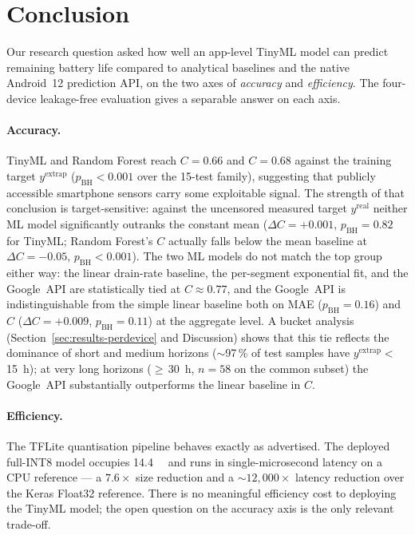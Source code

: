 \documentclass[conference]{IEEEtran}
\begin{document}
\section{Conclusion}
Our research question asked how well an app-level TinyML model can
predict remaining battery life compared to analytical baselines and
the native Android~12 prediction API, on the two axes of
\emph{accuracy} and \emph{efficiency}. The four-device leakage-free
evaluation gives a separable answer on each axis.

\paragraph{Accuracy.}
TinyML and Random Forest reach $C{=}0.66$ and $C{=}0.68$ against the
training target $y^{\text{extrap}}$ ($p_{\text{BH}} < 0.001$ over the
15-test family), suggesting that publicly accessible smartphone sensors
carry some exploitable signal. The strength of that conclusion is
target-sensitive: against the uncensored measured target
$y^{\text{real}}$ neither ML model significantly outranks the constant
mean ($\Delta C{=}{+}0.001$, $p_{\text{BH}}{=}0.82$ for TinyML;
Random Forest's $C$ actually falls below the mean baseline at
$\Delta C{=}{-}0.05$, $p_{\text{BH}}{<}0.001$). The two ML models do
not match the top group either way: the linear drain-rate baseline,
the per-segment exponential fit, and the Google~API are statistically
tied at $C \approx 0.77$, and the Google~API is indistinguishable
from the simple linear baseline both on MAE ($p_{\text{BH}}{=}0.16$)
and $C$ ($\Delta C{=}{+}0.009$, $p_{\text{BH}}{=}0.11$) at the
aggregate level. A bucket analysis
(Section~\ref{sec:results-perdevice} and Discussion) shows that this
tie reflects the dominance of short and medium horizons
($\sim$97\,\% of test samples have $y^{\text{extrap}} <$\,\SI{15}{\hour});
at very long horizons ($\geq$\,\SI{30}{\hour}, $n{=}58$ on the common
subset) the Google~API substantially outperforms the linear baseline
in $C$.

\paragraph{Efficiency.}
The TFLite quantisation pipeline behaves exactly as advertised. The
deployed full-INT8 model occupies \SI{14.4}{\kilo\byte} and runs in
single-microsecond latency on a CPU reference --- a $7.6\times$ size
reduction and a $\sim$$\!12{,}000\times$ latency reduction over the
Keras Float32 reference. There is no meaningful efficiency cost to
deploying the TinyML model; the open question on the accuracy axis
is the only relevant trade-off.
\end{document}
